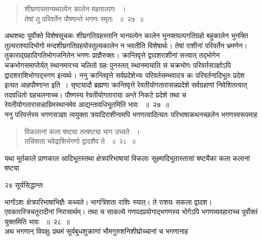 \documentclass[11pt, openany]{book}
\begin{document}
 
 \begin{quote}
 {\ssi शीघ्रगास्तान्यथाल्पेन कालेन महताल्पगः ~।\\
तेषां तु परिवर्तेन पौष्णान्ते भगणः स्मृतः ~॥~२७~॥ }
\end{quote}
\begin{sloppypar}

 अथशब्दः पूर्वोक्ते विशेषसूचकः शीघ्रगतिग्रहस्तानि भान्यल्पेन कालेन भुनक्त्यल्पगतिग्रहो बहुकालेन भुनक्ति तुल्यराश्यादिभोगो मन्दशीघ्रगतिग्रहयोस्तुल्यकालेन न भवतीति विशेषार्थः। तेषां राशीनां परिवर्तेन भ्रमणेन। तुकाराद्ग्रहादिगतिभोगजनितेन भगणः प्राज्ञैरुक्तः। क्रान्तिवृत्ते द्वादशराशीनां सत्त्वात् तद्भोगेन चक्रभोगसमाप्तेर्यत् स्थानमारभ्य चलितो ग्रहः पुनस्तत् स्थानमायाति स चक्रभोगः परिवर्तसञ्ज्ञोऽपि द्वादशराशिभोगाद्भगण इत्यर्थः। ननु क्रान्तिवृत्ते सर्वप्रदेशेभ्यः परिवर्तसम्भवादत्र कः परिवर्तनादिभूतः प्रदेश इत्यत आह\textendash पौष्णान्त इति~। सृष्ट्यादौ ब्रह्मणा क्रान्तिवृत्ते रेवतीयोगतारासन्नप्रदेशे सर्वग्रहाणां निवेशितत्वात् तदवधितो ग्रहचलनाच्च। पौष्णस्य रेवतीयोगताराया अन्ते निकटे प्रदेशे तथा च रेवतीयोगतारासन्नाग्रिमस्थानमेव आद्यन्तावधिभूतमिति भावः ~॥~२७~॥\\ 
 \noindent ननु परिवर्त्तस्य भगणसञ्ज्ञा त्वयुक्ता त्रयादिराशीनामपि भगणत्वादित्यतः परिभाषाकथनच्छलेन भगणस्वरूपमाह\textendash
\end{sloppypar}
\begin{quote}
 
 {\ssi विकलानां कला षष्ट्या तत्षष्ट्या भाग उच्यते ~।\\
तत्त्रिंशता भवेद्राशिर्भगणो द्वादशैव ते ~॥~२८~॥}
\end{quote}
\begin{sloppypar}
 यथा मूर्तकाले प्राणकाल आदिभूतस्तथा क्षेत्रपरिभाषायां विकलाः सूक्ष्मादिभूतास्तासां षष्ट्यैका कला कलानां षष्ट्या
\end{sloppypar}

\newpage

\noindent २४ \hspace{4cm} सूर्यसिद्धान्तः
\vspace{1cm}
 
\begin{sloppypar}
\noindent भागोंऽशः क्षेत्रपरिभाषाभिज्ञैः कथ्यते। भागत्रिंशता राशिः स्यात्। ते राशयः सकला द्वादश। एवकारस्त्रिचतुरादीनां निरासार्थम्। तथा च साकल्ये गणपदप्रयोगाद्भगणस्य भोगेऽपि भगणव्यवहाराच्च पूर्वोक्तं युक्तमिति भावः ~॥~२८~॥\\  
\noindent अथ भगणान् विवक्षुः प्रथमं सूर्यबुधशुक्राणां भौमगुरुशनिशीघ्रोच्चानां च भगणानाह\textendash
\end{sloppypar}
\end{document}
